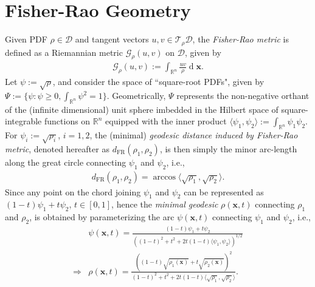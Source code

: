 \documentclass[letterpaper,10pt,twocolumn,conference]{ieeeconf}
\newcommand{\cG}{{\mathcal G}}
\newcommand{\cD}{{\mathscr{D}}}
\newcommand{\bbx}{{\bm{x}}}
\newcommand{\dFR}{d_{\mathrm{FR}}}
\newcommand{\differential}{\operatorname{d}}
\begin{document}
\section{Fisher-Rao Geometry}\label{FRGeometrySection}
Given PDF $\rho\in\cD$ and tangent vectors $u,v\in\mathcal{T}_{\rho}\cD$, the \emph{Fisher-Rao metric} is defined as a Riemannian metric $\cG_{\rho}\left(u,v\right)$ on $\cD$, given by
\begin{eqnarray}
	\cG_{\rho}\left(u,v\right) := \displaystyle\int_{\mathbb{R}^{n}} \frac{uv}{\rho}\differential\bbx.
\label{FRMetricDefn}	
\end{eqnarray}
Let $\psi:=\sqrt{\rho}$, and consider the space of ``square-root PDFs", given by $\Psi := \{\psi: \psi \geq 0, \int_{\mathbb{R}^{n}}\psi^{2} = 1\}$. Geometrically, $\Psi$ represents the non-negative orthant of the (infinite dimensional) unit sphere imbedded in the Hilbert space of square-integrable functions on $\mathbb{R}^{n}$ equipped with the inner product $\langle \psi_{1}, \psi_{2} \rangle := \int_{\mathbb{R}^{n}}\psi_{1}\psi_{2}$. For $\psi_{i} := \sqrt{\rho_{i}}$, $i=1,2$, the (minimal) \emph{geodesic distance induced by Fisher-Rao metric}, denoted hereafter as $\dFR(\rho_{1},\rho_{2})$, is then simply the minor arc-length along the great circle connecting $\psi_{1}$ and $\psi_{2}$, i.e.,
\begin{eqnarray}
	\dFR(\rho_{1},\rho_{2}) = \arccos\langle\sqrt{\rho_{1}},\sqrt{\rho_{2}}\rangle.
	\label{GeodesicDistNonparam}
\end{eqnarray}
Since any point on the chord joining $\psi_{1}$ and $\psi_{2}$ can be represented as $(1-t)\psi_{1} + t\psi_{2}$, $t\in[0,1]$, hence the \emph{minimal geodesic} $\rho(\bbx,t)$ connecting $\rho_{1}$ and $\rho_{2}$, is obtained by parameterizing the arc $\psi(\bbx,t)$ connecting $\psi_{1}$ and $\psi_{2}$, i.e.,
\begin{align}
&\psi(\bbx,t) = \displaystyle\frac{(1-t)\psi_{1} + t\psi_{2}}{\left((1-t)^{2} + t^{2} + 2t(1-t)\langle\psi_{1},\psi_{2}\rangle\right)^{1/2}}\nonumber\\
	\Rightarrow &\rho\left(\bbx, t\right) = \displaystyle\frac{\left((1-t)\sqrt{\rho_{1}(\bbx)} + t\sqrt{\rho_{2}(\bbx)}\right)^{2}}{(1-t)^{2} + t^{2} + 2t(1-t)\langle\sqrt{\rho_{1}},\sqrt{\rho_{2}}\rangle}.
	\label{GeodesicNonparam}
\end{align}
\end{document}
